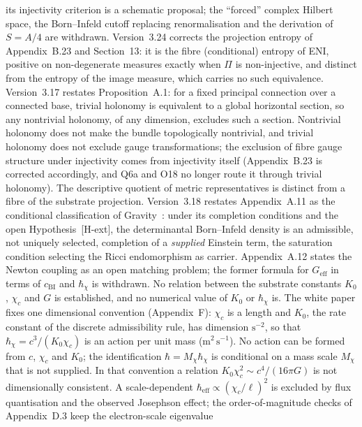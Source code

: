 \documentclass[11pt,a4paper]{article}
\begin{document}
    its injectivity criterion is a schematic proposal; the ``forced'' complex Hilbert space, the Born--Infeld cutoff
    replacing renormalisation and the derivation of $S = A/4$ are withdrawn.
    Version~3.24 corrects the projection entropy of Appendix~B.23 and Section~13: it is the fibre
    (conditional) entropy of ENI, positive on non-degenerate measures exactly when $\Pi$ is non-injective, and
    distinct from the entropy of the image measure, which carries no such equivalence.
    Version~3.17 restates Proposition~A.1: for a fixed principal connection over a connected base, trivial
    holonomy is equivalent to a global horizontal section, so any nontrivial holonomy, of any dimension,
    excludes such a section.
    Nontrivial holonomy does not make the bundle topologically nontrivial, and trivial holonomy does not exclude
    gauge transformations; the exclusion of fibre gauge structure under injectivity comes from injectivity itself
    (Appendix~B.23 is corrected accordingly, and Q6a and O18 no longer route it through trivial holonomy).
    The descriptive quotient of metric representatives is distinct from a fibre of the substrate projection.
    Version~3.18 restates Appendix~A.11 as the conditional classification of Gravity~\cite{Beau2026h}: under its
    completion conditions and the open Hypothesis~[H-ext], the determinantal Born--Infeld density is an admissible,
    not uniquely selected, completion of a \emph{supplied} Einstein term, the saturation condition selecting the
    Ricci endomorphism as carrier.
    Appendix~A.12 states the Newton coupling as an open matching problem; the former formula for
    $G_{\mathrm{eff}}$ in terms of $c_{\mathrm{BI}}$ and $\hbar_\chi$ is withdrawn.
    No relation between the substrate constants $K_0$, $\chi_c$ and $G$ is established, and no numerical value of
    $K_0$ or $\hbar_\chi$ is.
    The white paper fixes one dimensional convention (Appendix~F): $\chi_c$ is a length and $K_0$, the rate constant
    of the discrete admissibility rule, has dimension $\mathrm{s}^{-2}$, so that $\hbar_\chi = c^3/(K_0\chi_c)$ is an
    action per unit mass ($\mathrm{m}^2\,\mathrm{s}^{-1}$).
    No action can be formed from $c$, $\chi_c$ and $K_0$; the identification $\hbar = M_\chi\hbar_\chi$ is conditional
    on a mass scale $M_\chi$ that is not supplied.
    In that convention a relation $K_0\chi_c^2 \sim c^4/(16\pi G)$ is not dimensionally consistent.
    A scale-dependent $\hbar_{\mathrm{eff}} \propto (\chi_c/\ell)^2$ is excluded by flux quantisation
    and the observed Josephson effect; the order-of-magnitude checks of Appendix~D.3 keep the electron-scale eigenvalue
\end{document}
